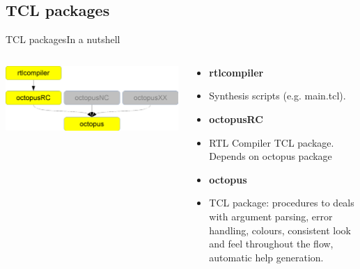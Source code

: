 \documentclass{beamer}
\begin{document}
\subsection{TCL packages}
\begin{frame}{TCL packages}{In a nutshell}
\begin{columns}
\begin{column}{0.4\textwidth}
	\centering
	\includegraphics[width=\textwidth,height=0.6\textheight]{./support_pictures/export/TCL_packages.png}
\end{column}
\begin{column}{0.6\textwidth}
	\begin{itemize}
	 \item \textbf{rtlcompiler}
	 \item []<2-|alert@2>Synthesis scripts (e.g. {{main.tcl}}).
	 \item \textbf{octopusRC}
	 \item []<3-|alert@3>RTL Compiler TCL package. Depends on octopus package
	 \item \textbf{octopus}
	 \item []<4-|alert@4>TCL package: procedures to deals with argument parsing, error handling, colours, consistent look and feel throughout the flow, automatic help generation.
	\end{itemize} 
\end{column}
\end{columns}
\end{frame}
\end{document}
